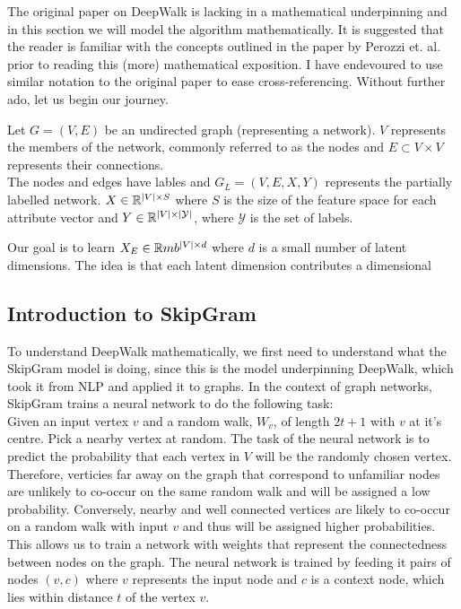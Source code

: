 \documentclass[a4paper]{article}
\begin{document}
The original paper on DeepWalk is lacking in a mathematical underpinning and in
this section we will model the algorithm mathematically. It is suggested that the reader
is familiar with the concepts outlined in the paper by Perozzi et. al. prior to
reading this (more) mathematical exposition. I have endevoured to use similar
notation to the original paper to ease cross-referencing. Without further ado, let us begin
our journey.

\begin{definition}
  Let $G = (V, E)$ be an undirected graph (representing a network). $V$ represents the
  members of the network, commonly referred to as the nodes and $E \subset V
  \times V$ represents their connections.\\

  The nodes and edges have lables and $G_L = (V, E, X, Y)$ represents the
  partially labelled network. $X \in \R^{|V| \times S}$ where $S$ is the size of
  the feature space for each attribute vector and $Y \in \R^{|V| \times
    |\mathcal{Y}|}$, where $\mathcal{Y}$ is the set of labels.
\end{definition}

Our goal is to learn $X_E \in \R mb^{|V| \times d}$ where $d$ is a small number
of latent dimensions. The idea is that each latent dimension contributes a 
dimensional

\subsection{Introduction to SkipGram}
To understand DeepWalk mathematically, we first need to understand what the SkipGram
model is doing, since this is the model underpinning DeepWalk, which took it
from NLP and applied it to graphs. In the context of graph networks, SkipGram trains a neural network to do the
following task:\\
Given an input vertex $v$ and a random walk, $W_{v}$, of length $2t+1$ with $v$
at it's centre. Pick a nearby vertex at random. The task of the neural network is to
predict the probability that each vertex in $V$ will be the randomly chosen
vertex. Therefore, verticies far away on the graph that correspond to unfamiliar
nodes are unlikely to co-occur on the same random walk and will be assigned a
low probability. Conversely, nearby and well connected vertices are likely to
co-occur on a random walk with input $v$ and thus will be assigned higher
probabilities. This allows us to train a network with weights that represent the
connectedness between nodes on the graph. The neural network is trained by
feeding it pairs of nodes $(v, c)$ where $v$ represents the input node and $c$ is a context node, which lies within distance
$t$ of the vertex $v$.\\ 
\end{document}
